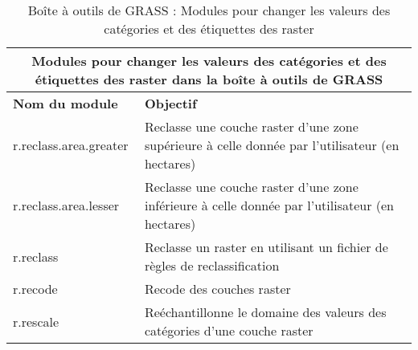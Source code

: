 \begin{table}[ht]
\centering
\caption{Bo\^ite \`a outils de GRASS : Modules pour changer les valeurs des cat\'egories et des \'etiquettes des raster}\medskip
 \begin{tabular}{|p{4cm}|p{12cm}|}
  \hline \multicolumn{2}{|c|}{\textbf{Modules pour changer les valeurs des cat\'egories et des \'etiquettes des raster dans la bo\^ite \`a outils de GRASS}}\\
  \hline \textbf{Nom du module} & \textbf{Objectif} \\
  \hline r.reclass.area.greater & Reclasse une couche raster d'une zone sup\'erieure \`a celle donn\'ee par l'utilisateur (en hectares) \\
  \hline r.reclass.area.lesser & Reclasse une couche raster d'une zone inf\'erieure \`a celle donn\'ee par l'utilisateur (en hectares) \\
  \hline r.reclass & Reclasse un raster en utilisant un fichier de r\`egles de reclassification \\
  \hline r.recode & Recode des couches raster \\
  \hline r.rescale & Re\'echantillonne le domaine des valeurs des cat\'egories d'une couche raster \\
\hline
\end{tabular}
\end{table}

